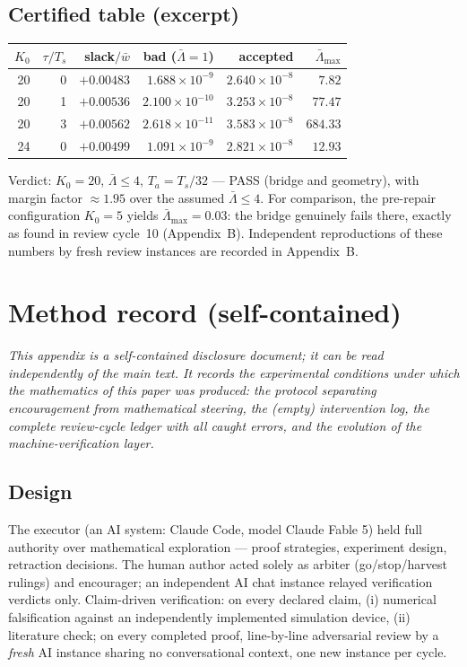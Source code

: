 \documentclass[11pt]{article}
\newcommand{\Ts}{T_s}
\newcommand{\Ta}{T_a}
\newcommand{\relL}{\bar\Lambda}
\newcommand{\wbar}{\bar w}
\begin{document}
\subsection{Certified table (excerpt)}\label{app:certtable}
\begin{center}
\begin{tabular}{rrrrrr}
\toprule
$K_0$ & $\tau/\Ts$ & slack$/\wbar$ & bad ($\relL{=}1$) & accepted & $\relL_{\max}$\\
\midrule
20 & 0 & $+0.00483$ & $1.688\times10^{-9}$ & $2.640\times10^{-8}$ & $\mathbf{7.82}$\\
20 & 1 & $+0.00536$ & $2.100\times10^{-10}$ & $3.253\times10^{-8}$ & $77.47$\\
20 & 3 & $+0.00562$ & $2.618\times10^{-11}$ & $3.583\times10^{-8}$ & $684.33$\\
24 & 0 & $+0.00499$ & $1.091\times10^{-9}$ & $2.821\times10^{-8}$ & $12.93$\\
\bottomrule
\end{tabular}
\end{center}
Verdict: $K_0=20$, $\relL\le4$, $\Ta=\Ts/32$ --- PASS (bridge and geometry),
with margin factor $\approx1.95$ over the assumed $\relL\le4$. For
comparison, the pre-repair configuration $K_0=5$ yields
$\relL_{\max}=0.03$: the bridge genuinely fails there, exactly as found in
review cycle~10 (Appendix~B). Independent reproductions of these numbers by
fresh review instances are recorded in Appendix~B.

\section{Method record (self-contained)}\label{app:method}

\emph{This appendix is a self-contained disclosure document; it can be read
independently of the main text. It records the experimental conditions under
which the mathematics of this paper was produced: the protocol separating
encouragement from mathematical steering, the (empty) intervention log, the
complete review-cycle ledger with all caught errors, and the evolution of
the machine-verification layer.}

\subsection{Design}
The executor (an AI system: Claude Code, model Claude Fable 5) held full
authority over mathematical exploration --- proof strategies, experiment
design, retraction decisions. The human author acted solely as arbiter
(go/stop/harvest rulings) and encourager; an independent AI chat instance
relayed verification verdicts only. Claim-driven verification: on every
declared claim, (i) numerical falsification against an independently
implemented simulation device, (ii) literature check; on every completed
proof, line-by-line adversarial review by a \emph{fresh} AI instance sharing
no conversational context, one new instance per cycle.
\end{document}
